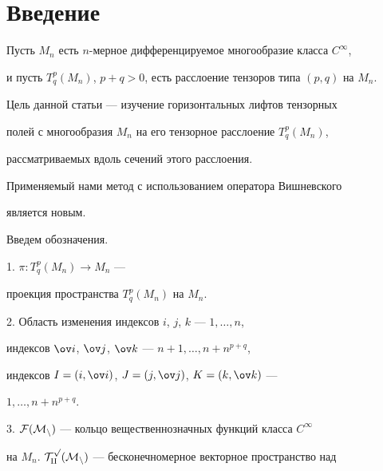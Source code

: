 

\maketitle


\label{begin}





\section{Введение}





Пусть $M_n$ есть $n$-мерное дифференцируемое многообразие класса $C^\infty$,


и пусть $T^p_q(M_n)$, $p+q>0$, есть расслоение тензоров типа $(p,q)$ на $M_n$.


Цель данной статьи --- изучение горизонтальных лифтов тензорных


полей с многообразия $M_n$ на его тензорное расслоение $T^p_q (M_n)$,


рассматриваемых вдоль сечений этого расслоения. 


Применяемый нами метод с использованием оператора Вишневского 


является новым.





Введем обозначения.





1. $\pi : T^p_q(M_n) \to M_n$ ---


проекция пространства $T^p_q(M_n)$ на $M_n$.





2. Область изменения индексов $i$, $j$, $k$ --- $1, \dotsc, n$,


индексов $\ov i$, $\ov j$, $\ov k$ --- $n+1, \dotsc, n + n^{p+q}$, 


индексов $I = (i, \ov i)$, $J = (j, \ov j)$, $K = (k, \ov k)$ --- 


$1, \dotsc, n + n^{p+q}$.





3. $\cal F(M_n)$ --- кольцо вещественнозначных функций класса $C^\infty$ 


на $M_n$.\; $\cal T^p_q(M_n)$ --- бесконечномерное векторное пространство над 


